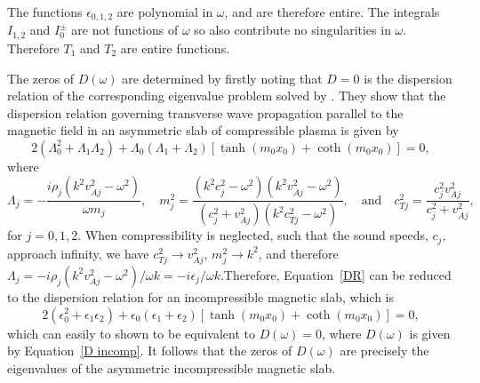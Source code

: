 \documentclass{aastex61}
\begin{document}
The functions $\epsilon_{0,1,2}$ are polynomial in $\omega$, and are therefore entire. The integrals $I_{1,2}$ and $I_0^\pm$ are not functions of $\omega$ so also contribute no singularities in $\omega$. Therefore $T_1$ and $T_2$ are entire functions.

The zeros of $D(\omega)$ are determined by firstly noting that $D=0$ is the dispersion relation of the corresponding eigenvalue problem solved by \cite{zsa_etal18}. They show that the dispersion relation governing transverse wave propagation parallel to the magnetic field in an asymmetric slab of compressible plasma is given by
\begin{equation}
2(\Lambda_0^2 + \Lambda_1 \Lambda_2) + \Lambda_0(\Lambda_1 + \Lambda_2)[\tanh(m_0x_0) + \coth(m_0x_0)] = 0,
\label{DR}
\end{equation}
where
\begin{equation}
\Lambda_j = -\frac{i\rho_j(k^2v_{Aj}^2 - \omega^2)}{\omega m_j},
\quad
m_j^2 = \frac{(k^2c_j^2 - \omega^2)(k^2v_{Aj}^2 - \omega^2)}{(c_j^2 + v_{Aj}^2)(k^2c_{Tj}^2 - \omega^2)},
\quad
\text{and}
\quad
c_{Tj}^2 = \frac{c_j^2v_{Aj}^2}{c_j^2 + v_{Aj}^2},
\end{equation}
for $j = 0, 1, 2$. When compressibility is neglected, such that the sound speeds, $c_j$, approach infinity, we have $c_{Tj}^2 \to v_{Aj}^2$, $m_j^2 \to k^2$, and therefore $\Lambda_j = -i\rho_j(k^2v_{Aj}^2 - \omega^2)/\omega k = -i\epsilon_j / \omega k$.Therefore, Equation~\eqref{DR} can be reduced to the dispersion relation for an incompressible magnetic slab, which is
\begin{equation}
2(\epsilon_0^2 + \epsilon_1 \epsilon_2) + \epsilon_0(\epsilon_1 + \epsilon_2)[\tanh(m_0x_0) + \coth(m_0x_0)] = 0,
\end{equation}
which can easily to shown to be equivalent to $D(\omega) = 0$, where $D(\omega)$ is given by Equation~\eqref{D incomp}. It follows that the zeros of $D(\omega)$ are precisely the eigenvalues of the asymmetric incompressible magnetic slab.
\end{document}
